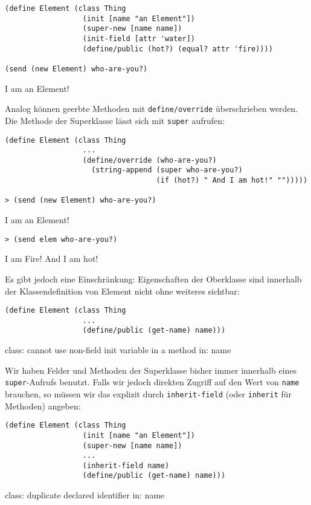 \begin{lstlisting}
(define Element (class Thing 
                  (init [name "an Element"])
                  (super-new [name name])
                  (init-field [attr 'water])
                  (define/public (hot?) (equal? attr 'fire))))
  
(send (new Element) who-are-you?)
\end{lstlisting}
{\routput {\qq}I am an Element!\qq}

Analog können geerbte Methoden mit \texttt{define/override} überschrieben werden. Die Methode der Superklasse lässt sich mit \texttt{super} aufrufen:

\begin{lstlisting}
(define Element (class Thing 
                  ...
                  (define/override (who-are-you?)
                    (string-append (super who-are-you?)
                                   (if (hot?) " And I am hot!" "")))))
                                   
> (send (new Element) who-are-you?)
\end{lstlisting}
{\routput {\qq}I am an Element!\qq}

\begin{lstlisting}
> (send elem who-are-you?)
\end{lstlisting}
{\routput {\qq}I am Fire! And I am hot!\qq}

Es gibt jedoch eine Einschränkung: Eigenschaften der Oberklasse sind innerhalb der Klassendefinition von Element nicht ohne weiteres sichtbar: 

\begin{lstlisting}
(define Element (class Thing 
                  ...
                  (define/public (get-name) name)))
\end{lstlisting}
{\rerror class: cannot use non-field init variable in a method in: name}

Wir haben Felder und Methoden der Superklasse bisher immer innerhalb eines \texttt{super}-Aufrufs benutzt. Falls wir jedoch direkten Zugriff auf den Wert von \texttt{name} brauchen, so müssen wir das explizit durch \texttt{inherit-field} (oder \texttt{inherit} für Methoden) angeben:

\begin{lstlisting}
(define Element (class Thing 
                  (init [name "an Element"])
                  (super-new [name name])
                  ...
                  (inherit-field name)
                  (define/public (get-name) name)))
\end{lstlisting}
{\rerror  class: duplicate declared identifier in: name}


